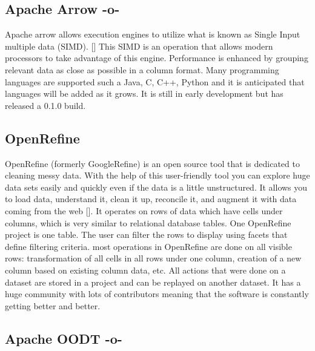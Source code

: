 \subsection{Apache Arrow -o-}
     
Apache arrow allows execution engines to utilize what is known as
Single Input multiple data (SIMD). [\cite{www-arrow}] This SIMD is an
operation that allows modern processors to take advantage of this
engine.  Performance is enhanced by grouping relevant data as close as
possible in a column format.  Many programming languages are supported
such a Java, C, C++, Python and it is anticipated that languages will
be added as it grows.  It is still in early development but has
released a 0.1.0 build.

\subsection{OpenRefine}

OpenRefine (formerly GoogleRefine) is an open source tool that is
dedicated to cleaning messy data. With the help of this user-friendly
tool you can explore huge data sets easily and quickly even if the
data is a little unstructured. It allows you to load data, understand
it, clean it up, reconcile it, and augment it with data coming from
the web [\cite{www-openrefine}]. It operates on rows of data which have
cells under columns, which is very similar to relational database
tables. One OpenRefine project is one table. The user can filter the
rows to display using facets that define filtering criteria. most
operations in OpenRefine are done on all visible rows: transformation
of all cells in all rows under one column, creation of a new column
based on existing column data, etc. All actions that were done on a
dataset are stored in a project and can be replayed on another
dataset. It has a huge community with lots of contributors meaning
that the software is constantly getting better and better.

\subsection{Apache OODT -o-}


